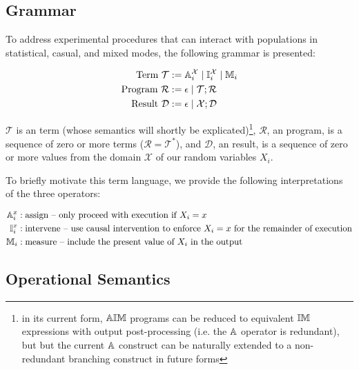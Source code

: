 \documentclass{article}
\begin{document}
\subsection{Grammar}

To address experimental procedures that can interact with populations in statistical, casual, and mixed modes, the following grammar is presented:

\newcommand{\X}{\mathcal{X}}

\newcommand{\T}{\mathcal{T}}
\newcommand{\R}{\mathcal{R}}
\newcommand{\D}{\mathcal{D}}

\newcommand{\U}{\mathcal{U}}
\newcommand{\MU}{\Theta}

\renewcommand{\O}{\mathcal{O}}
\newcommand{\Int}{\mathcal{I}}

\begin{align*}
\text{Term } \T &:= \A^{\mathcal{X}}_{i} \mid \I^{\mathcal{X}}_i \mid \M_i \\
\text{Program } \R &:= \epsilon \mid \T ; \R \\
\text{Result } \D &:= \epsilon \mid \X ; \D 
\end{align*}

$\T$ is an \AIM term (whose semantics will shortly be explicated)\footnote{in its current form, $\mathbb{A}\mathbb{I}\mathbb{M}$ programs can be reduced to equivalent $\mathbb{I}\mathbb{M}$ expressions with output post-processing (i.e. the $\mathbb{A}$ operator is redundant), but but the current $\mathbb{A}$ construct can be naturally extended to a non-redundant branching construct in future forms}, $\R$, an \AIM program, is a sequence of zero or more terms ($\R = \T^*$), and $\D$, an \AIM result, is a sequence of zero or more values from the domain $\X$ of our random variables $X_i$.

To briefly motivate this term language, we provide the following interpretations of the three operators:

\begin{align*}
  \mathbb{A}_i^x &: \text{assign -- only proceed with execution if } X_i = x\\
  \mathbb{I}_i^x &: \text{intervene -- use causal intervention to enforce } X_i = x \text{ for the remainder of execution}\\
  \mathbb{M}_i &: \text{measure -- include the present value of } X_i \text{ in the output}\\
\end{align*}

\subsection{Operational Semantics}
\end{document}
